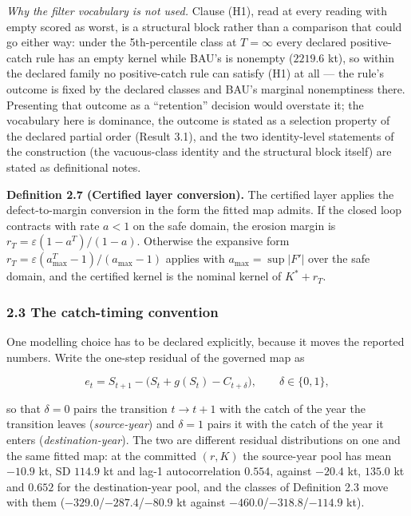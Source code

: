 \documentclass[11pt]{article}
\begin{document}
\emph{Why the filter vocabulary is not used.} Clause (H1), read at every
reading with empty scored as worst, is a structural block rather than a
comparison that could go either way: under the 5th-percentile class at
\(T=\infty\) every declared positive-catch rule has an empty kernel
while BAU's is nonempty (\(2219.6\) kt), so within the declared family
no positive-catch rule can satisfy (H1) at all --- the rule's outcome is
fixed by the declared classes and BAU's marginal nonemptiness there.
Presenting that outcome as a ``retention'' decision would overstate it;
the vocabulary here is dominance, the outcome is stated as a selection
property of the declared partial order (Result 3.1), and the two
identity-level statements of the construction (the vacuous-class
identity and the structural block itself) are stated as definitional
notes.

\textbf{Definition 2.7 (Certified layer conversion).} The certified
layer applies the defect-to-margin conversion in the form the fitted map
admits. If the closed loop contracts with rate \(a < 1\) on the safe
domain, the erosion margin is \(r_T = \varepsilon(1-a^T)/(1-a)\).
Otherwise the expansive form
\(r_T = \varepsilon(a_{\max}^T - 1)/(a_{\max} - 1)\) applies with
\(a_{\max} = \sup|F'|\) over the safe domain, and the certified kernel
is the nominal kernel of \(K^* + r_T\).

\subsubsection{2.3 The catch-timing convention}\label{budget-the-catch-timing-convention}

One modelling choice has to be declared explicitly, because it moves the
reported numbers. Write the one-step residual of the governed map as

\[e_t = S_{t+1} - \bigl(S_t + g(S_t) - C_{t+\delta}\bigr),\qquad
\delta \in \{0, 1\},\]

so that \(\delta = 0\) pairs the transition \(t \to t+1\) with the catch
of the year the transition leaves (\emph{source-year}) and \(\delta = 1\)
pairs it with the catch of the year it enters
(\emph{destination-year}). The two are different residual distributions
on one and the same fitted map: at the committed \((r, K)\) the
source-year pool has mean \(-10.9\) kt, SD \(114.9\) kt and lag-1
autocorrelation \(0.554\), against \(-20.4\) kt, \(135.0\) kt and
\(0.652\) for the destination-year pool, and the classes of Definition 2.3
move with them (\(-329.0\)/\(-287.4\)/\(-80.9\) kt against
\(-460.0\)/\(-318.8\)/\(-114.9\) kt).
\end{document}
